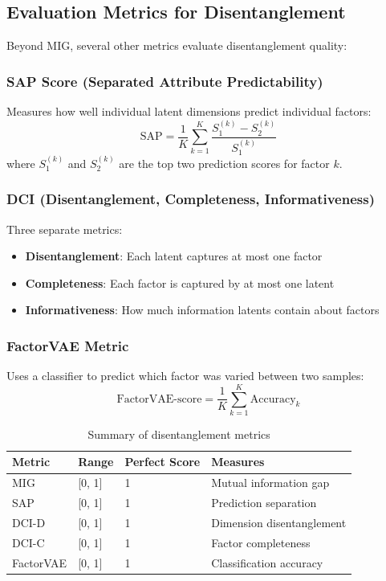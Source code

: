 \documentclass[conference]{IEEEtran}
\begin{document}
\subsection{Evaluation Metrics for Disentanglement}

Beyond MIG, several other metrics evaluate disentanglement quality:

\subsubsection{SAP Score (Separated Attribute Predictability)}

Measures how well individual latent dimensions predict individual factors:
\begin{equation}
\text{SAP} = \frac{1}{K} \sum_{k=1}^{K} \frac{S_1^{(k)} - S_2^{(k)}}{S_1^{(k)}}
\end{equation}
where $S_1^{(k)}$ and $S_2^{(k)}$ are the top two prediction scores for factor $k$.

\subsubsection{DCI (Disentanglement, Completeness, Informativeness)}

Three separate metrics:
\begin{itemize}
    \item \textbf{Disentanglement}: Each latent captures at most one factor
    \item \textbf{Completeness}: Each factor is captured by at most one latent
    \item \textbf{Informativeness}: How much information latents contain about factors
\end{itemize}

\subsubsection{FactorVAE Metric}

Uses a classifier to predict which factor was varied between two samples:
\begin{equation}
\text{FactorVAE-score} = \frac{1}{K} \sum_{k=1}^{K} \text{Accuracy}_k
\end{equation}

\begin{table}[H]
\centering
\begin{tabular}{@{}llll@{}}
\toprule
\textbf{Metric} & \textbf{Range} & \textbf{Perfect Score} & \textbf{Measures} \\ \midrule
MIG & [0, 1] & 1 & Mutual information gap \\
SAP & [0, 1] & 1 & Prediction separation \\
DCI-D & [0, 1] & 1 & Dimension disentanglement \\
DCI-C & [0, 1] & 1 & Factor completeness \\
FactorVAE & [0, 1] & 1 & Classification accuracy \\ \bottomrule
\end{tabular}
\caption{Summary of disentanglement metrics}
\label{tab:disentangle_metrics}
\end{table}
\end{document}
